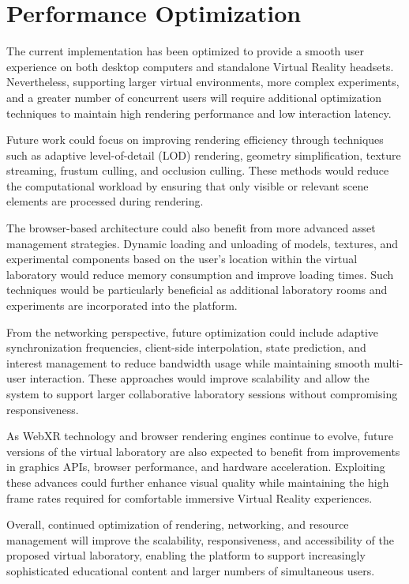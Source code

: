 \section{Performance Optimization}

The current implementation has been optimized to provide a smooth user experience on both desktop computers and standalone Virtual Reality headsets. Nevertheless, supporting larger virtual environments, more complex experiments, and a greater number of concurrent users will require additional optimization techniques to maintain high rendering performance and low interaction latency.

Future work could focus on improving rendering efficiency through techniques such as adaptive level-of-detail (LOD) rendering, geometry simplification, texture streaming, frustum culling, and occlusion culling. These methods would reduce the computational workload by ensuring that only visible or relevant scene elements are processed during rendering.

The browser-based architecture could also benefit from more advanced asset management strategies. Dynamic loading and unloading of models, textures, and experimental components based on the user's location within the virtual laboratory would reduce memory consumption and improve loading times. Such techniques would be particularly beneficial as additional laboratory rooms and experiments are incorporated into the platform.

From the networking perspective, future optimization could include adaptive synchronization frequencies, client-side interpolation, state prediction, and interest management to reduce bandwidth usage while maintaining smooth multi-user interaction. These approaches would improve scalability and allow the system to support larger collaborative laboratory sessions without compromising responsiveness.

As WebXR technology and browser rendering engines continue to evolve, future versions of the virtual laboratory are also expected to benefit from improvements in graphics APIs, browser performance, and hardware acceleration. Exploiting these advances could further enhance visual quality while maintaining the high frame rates required for comfortable immersive Virtual Reality experiences.

Overall, continued optimization of rendering, networking, and resource management will improve the scalability, responsiveness, and accessibility of the proposed virtual laboratory, enabling the platform to support increasingly sophisticated educational content and larger numbers of simultaneous users.

